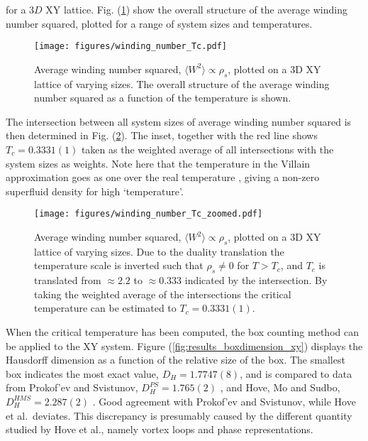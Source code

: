 \noindent for a $3D$ XY lattice. Fig. (\ref{fig:results_windingnumberTc}) show the overall structure of the average winding number squared, plotted for a range of system sizes and temperatures.

\begin{figure}[h!]
    \centering
        \texttt{[image: figures/winding\_number\_Tc.pdf]}
    \caption{Average winding number squared, $\langle W^2 \rangle \propto \rho_s$, plotted on a 3D XY lattice of varying sizes. The overall structure of the average winding number squared as a function of the temperature is shown.}
    \label{fig:results_windingnumberTc}
\end{figure}

\newpage

The intersection between all system sizes of average winding number squared is then determined in Fig. (\ref{fig:results_windingnumberTcZoomed}). The inset, together with the red line shows $T_c = 0.3331(1)$ taken as the weighted average of all intersections with the system sizes as weights. Note here that the temperature in the Villain approximation goes as one over the real temperature \cite{Villain:VillainOriginalPaper}, giving a non-zero superfluid density for high `temperature'.

\begin{figure}[h!]
    \centering
        \texttt{[image: figures/winding\_number\_Tc\_zoomed.pdf]}
    \caption{Average winding number squared, $\langle W^2 \rangle \propto \rho_s$, plotted on a 3D XY lattice of varying sizes. Due to the duality translation the temperature scale is inverted such that $\rho_s \neq 0$ for $T > T_c$, and $T_c$ is translated from $\approx 2.2$ \cite{Gottlob:CritBehaviour3DXY} to $\approx 0.333$ indicated by the intersection. By taking the weighted average of the intersections the critical temperature can be estimated to $T_c = 0.3331(1)$.}
    \label{fig:results_windingnumberTcZoomed}
\end{figure}


\newpage

When the critical temperature has been computed, the box counting method can be applied to the XY system. Figure (\ref{fig:results_boxdimension_xy}) displays the Hausdorff dimension as a function of the relative size of the box. The smallest box indicates the most exact value, $D_H = 1.7747(8)$, and is compared to data from Prokof'ev and Svistunov, $D_H^{PS} = 1.765(2)$ \cite{Prokofev:comment_on_hove_hausdorff_crit_fluct}, and Hove, Mo and Sudbo, $D_H^{HMS} = 2.287(2)$  \cite{Hove:hausdorff_crit_fluctuations}. Good agreement with Prokof'ev and Svistunov, while Hove et al.\ deviates. This discrepancy is presumably caused by the different quantity studied by Hove et al., namely vortex loops and phase representations.

